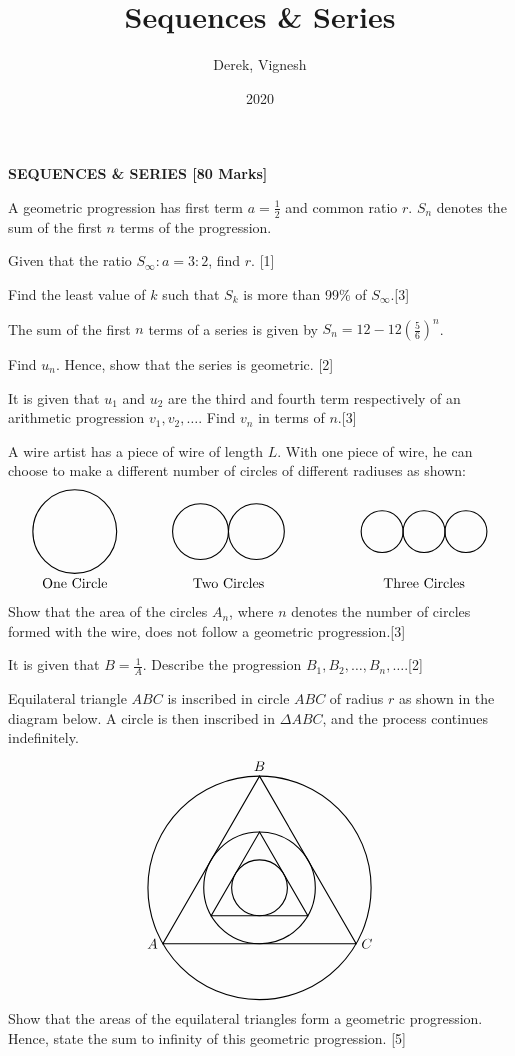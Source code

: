 \documentclass[12pt, a4 paper]{article}
\title{Sequences \& Series}
\author{Derek, Vignesh}
\date{2020}
\begin{document}
\maketitle

\textbf{SEQUENCES \& SERIES [80 Marks]}
\begin{outline}[enumerate]
\1 A geometric progression has first term \(a=\frac{1}{2}\) and common ratio \(r\). \(S_{n}\) denotes the sum of the first \(n\) terms of the progression. %

  \2 Given that the ratio \(S_{\infty}:a=3:2\), find $r$. \hfill[1]

  \2 Find the least value of \(k\) such that \(S_{k}\) is more than 99\% of \(S_{\infty}\).\hfill[3]

\1 The sum of the first \(n\) terms of a series is given by \(S_{n}=12-12\left(\frac{5}{6}\right)^{n}\). %

  \2 Find \(u_{n}\). Hence, show that the series is geometric. \hfill[2]

  \2 It is given that \(u_{1}\) and \(u_{2}\) are the third and fourth term respectively of an arithmetic progression \(v_{1},v_{2},\dots\). Find \(v_{n}\) in terms of \(n\).\hfill[3]

\1 A wire artist has a piece of wire of length \(L\). With one piece of wire, he can choose to make a different number of circles of different radiuses as shown: %
\[
\begin{tikzpicture}
  \draw[thick] (0,0) circle (30pt);
  \draw (0,-30pt) node[below]{One Circle};
  \draw[thick] (90pt,0) circle (20pt);
  \draw[thick] (130pt,0) circle (20pt);
  \draw (110pt,-30pt) node[below]{Two Circles};
  \draw[thick] (220pt,0) circle (15pt);
  \draw[thick] (250pt,0) circle (15pt);
  \draw[thick] (280pt,0) circle (15pt);
  \draw (250pt,-30pt) node[below]{Three Circles};
\end{tikzpicture}
\]
  \2 Show that the area of the circles \(A_{n}\), where \(n\) denotes the number of circles formed with the wire, does not follow a geometric progression.\hfill[3]

  \2 It is given that \(B=\frac{1}{A}\). Describe the progression \(B_{1},B_{2},\dots,B_{n},\dots\).\hfill[2]

\1 Equilateral triangle \(ABC\) is inscribed in circle \(ABC\) of radius \(r\) as shown in the diagram below. A circle is then inscribed in \(\Delta ABC\), and the process continues indefinitely. %
\[
\begin{tikzpicture}
  \draw[thick] (0,0) circle (80pt);
  \draw[thick] (0,80pt) node[above]{\(B\)} -- (69.282pt,-40pt) node[right]{\(C\)} -- (-69.282pt,-40pt) node[left]{\(A\)} -- cycle;
  \draw[thick] (0,0) circle (40pt);
  \draw[thick] (0,40pt) -- (34.641pt,-20pt) -- (-34.641pt,-20pt) -- cycle;
  \draw[thick] (0,0) circle (20pt);
\end{tikzpicture}
\]
  \2 Show that the areas of the equilateral triangles form a geometric progression. Hence, state the sum to infinity of this geometric progression. \hfill[5]


\end{outline}
\end{document}
